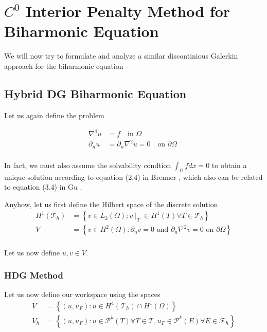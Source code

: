 \newpage
\section{ $C^0$ Interior Penalty Method for Biharmonic Equation}
\label{sec:ch1}

We will now try to formulate and analyze a similar discontinious Galerkin approach for the biharmonic equation


\subsection{Hybrid DG Biharmonic Equation}%
\label{sub:hybrid_dg_biharmonic_equation}

Let us again define the problem

\begin{equation}
\label{eq:HDG_bi_problem}
\begin{split}
    \nabla ^4 u & = f \quad \text{in } \Omega   \\
    \partial _{n} u & = \partial _{n} \nabla ^2 u = 0 \quad \text{on } \partial \Omega   \\
\end{split}
.\end{equation}

In fact, we must also assume the solvability condtion $ \int_{\Omega }^{} f dx = 0$ to obtain a unique solution according to
equation (2.4) in Brenner \cite{brenner2012}, which also can be related to equation (3.4) in Gu \cite{gu2012c0}.

Anyhow,
let us first define the Hilbert space of the discrete solution \[
\begin{split}
    H^{1}\left( \mathcal{T}_{h}  \right)  & = \left\{ v \in L_{2} \left( \Omega  \right) : v  \mid _{T} \in H^{1} \left( T
    \right) \forall T \in \mathcal{T}_{h}    \right\} \\
    V &=  \left\{ v \in H^2\left( \Omega  \right) : \partial _{n} v = 0 \text{ and } \partial _{n} \nabla ^2 v = 0 \text{ on } \partial \Omega  \right\} \\
\end{split}
\]

Let us now define $u,v \in V$.

\subsubsection{HDG Method}%
\label{ssub:dg_method}
Let us now define our workspace using the spaces
 \[
\begin{split}
    V &=  \left\{ \left( u, u_{F}  \right): u \in H^{4}\left( \mathcal{T} _{h} \right) \cap H^{1}\left( \Omega  \right)   \right\} \\
    V_{h} &=  \left\{ \left( u, u_{F}  \right) : u \in \mathcal{P} ^{k}\left( T \right) \forall T \in  \mathcal{T} ,
    u_{F} \in \mathcal{P} ^{k}\left( E \right) \forall E \in  \mathcal{F}_{h}    \right\} \\
\end{split}
\]

